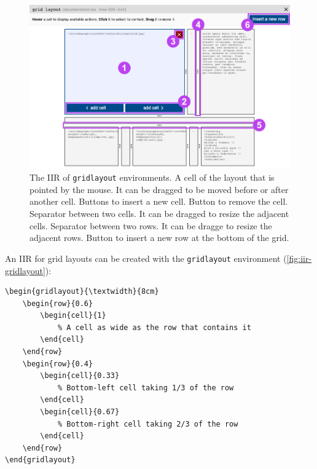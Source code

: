 \begin{figure}[h!]
    \centering
    \includegraphics[width = .95\textwidth]{img/iir-gridlayout.png}
    \caption{The IIR of \texttt{gridlayout} environments.  A cell of the layout that is pointed by the mouse. It can be dragged to be moved before or after another cell.  Buttons to insert a new cell.  Button to remove the cell.  Separator between two cells. It can be dragged to resize the adjacent cells.  Separator between two rows. It can be dragge to resize the adjacent rows.  Button to insert a new row at the bottom of the grid.}
    \label{fig:iir-gridlayout}
\end{figure}

An IIR for grid layouts can be created with the \texttt{gridlayout} environment (\autoref{fig:iir-gridlayout}):

\begin{lstlisting}[style=custom-latex]
% This grid is as wide as the text (\textwidth) and 8cm tall
\begin{gridlayout}{\textwidth}{8cm}
    \begin{row}{0.6}
        \begin{cell}{1}
            % A cell as wide as the row that contains it
        \end{cell}
    \end{row}
    \begin{row}{0.4}
        \begin{cell}{0.33}
            % Bottom-left cell taking 1/3 of the row
        \end{cell}
        \begin{cell}{0.67}
            % Bottom-right cell taking 2/3 of the row
        \end{cell}
    \end{row}
\end{gridlayout}
\end{lstlisting}


